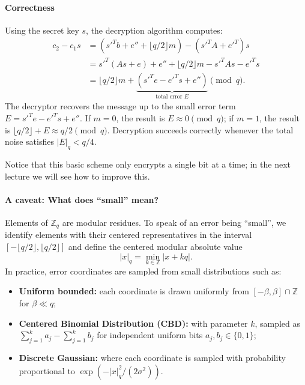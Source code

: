 \paragraph*{Correctness}
Using the secret key \(s\), the decryption algorithm computes:
\begin{align*}
    c_2 - c_1 s &= \left(s'^T b + e'' + \lfloor q/2 \rfloor m\right) - \left(s'^T A + e'^T\right) s \\
    &= s'^T (A s + e) + e'' + \lfloor q/2 \rfloor m - s'^T A s - e'^T s \\
    &= \lfloor q/2 \rfloor m + \underbrace{(s'^T e - e'^T s + e'')}_{\text{total error } E} \pmod q.
\end{align*}
The decryptor recovers the message up to the small error term \(E = s'^T e - e'^T s + e''\).
If \(m = 0\), the result is \(E \approx 0 \pmod q\); if \(m = 1\), the result is \(\lfloor q/2 \rfloor + E \approx q/2 \pmod q\).
Decryption succeeds correctly whenever the total noise satisfies \(|E|_q < q/4\).

Notice that this basic scheme only encrypts a single bit at a time; in the next lecture we will see how to improve this.

\paragraph*{A caveat: What does ``small'' mean?}
Elements of \(\mathbb{Z}_q\) are modular residues.
To speak of an error being ``small'', we identify elements with their centered representatives in the interval \([-\lfloor q/2 \rfloor, \lfloor q/2 \rfloor]\) and define the centered modular absolute value
\[
    |x|_q = \min_{k \in \mathbb{Z}} |x + kq|.
\]
In practice, error coordinates are sampled from small distributions such as:
\begin{itemize}
    \item \textbf{Uniform bounded:} each coordinate is drawn uniformly from \([-\beta, \beta] \cap \mathbb{Z}\) for \(\beta \ll q\);
    \item \textbf{Centered Binomial Distribution (CBD):} with parameter \(k\), sampled as \(\sum_{j=1}^k a_j - \sum_{j=1}^k b_j\) for independent uniform bits \(a_j, b_j \in \{0, 1\}\);
    \item \textbf{Discrete Gaussian:} where each coordinate is sampled with probability proportional to \(\exp(-|x|_q^2 / (2\sigma^2))\).
\end{itemize}